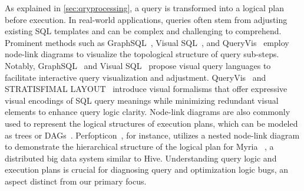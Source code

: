 As explained in \autoref{sec:qryprocessing}, a query is transformed into a logical plan before execution.
In real-world applications, queries often stem from adjusting existing SQL templates and can be complex and challenging to comprehend. 
Prominent methods such as GraphSQL~\cite{cerullo2007system}, Visual SQL~\cite{jaakkola2003visual}, and QueryVis~\cite{leventidis2020queryvis} employ node-link diagrams to visualize the topological structure of query sub-steps. Notably, GraphSQL~\cite{cerullo2007system} and Visual SQL~\cite{jaakkola2003visual} propose visual query languages to facilitate interactive query visualization and adjustment. QueryVis~\cite{leventidis2020queryvis} and STRATISFIMAL LAYOUT~\cite{di2021stratisfimal} introduce visual formalisms that offer expressive visual encodings of SQL query meanings while minimizing redundant visual elements to enhance query logic clarity. Node-link diagrams are also commonly used to represent the logical structures of execution plans, which can be modeled as trees or DAGs~\cite{tezui, sparkui, moritz2015perfopticon, battle2016making, simitsis2014vqa}. Perfopticon~\cite{moritz2015perfopticon}, for instance, utilizes a nested node-link diagram to demonstrate the hierarchical structure of the logical plan for Myria~\cite{halperin2014demonstration}	, a distributed big data system similar to Hive. Understanding query logic and execution plans is crucial for diagnosing query and optimization logic bugs, an aspect distinct from our primary focus.

